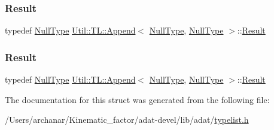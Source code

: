 \mbox{\label{structUtil_1_1TL_1_1Append_3_01NullType_00_01NullType_01_4_adc4800f4356ff026fe01fbcb9e2ce62f}} 
\subsubsection{\texorpdfstring{Result}{Result}\hspace{0.1cm}{\footnotesize\ttfamily [2/3]}}
{\footnotesize\ttfamily typedef \mbox{\hyperlink{classUtil_1_1NullType}{Null\+Type}} \mbox{\hyperlink{structUtil_1_1TL_1_1Append}{Util\+::\+T\+L\+::\+Append}}$<$ \mbox{\hyperlink{classUtil_1_1NullType}{Null\+Type}}, \mbox{\hyperlink{classUtil_1_1NullType}{Null\+Type}} $>$\+::\mbox{\hyperlink{structUtil_1_1TL_1_1Append_3_01NullType_00_01NullType_01_4_adc4800f4356ff026fe01fbcb9e2ce62f}{Result}}}

\mbox{\label{structUtil_1_1TL_1_1Append_3_01NullType_00_01NullType_01_4_adc4800f4356ff026fe01fbcb9e2ce62f}} 
\subsubsection{\texorpdfstring{Result}{Result}\hspace{0.1cm}{\footnotesize\ttfamily [3/3]}}
{\footnotesize\ttfamily typedef \mbox{\hyperlink{classUtil_1_1NullType}{Null\+Type}} \mbox{\hyperlink{structUtil_1_1TL_1_1Append}{Util\+::\+T\+L\+::\+Append}}$<$ \mbox{\hyperlink{classUtil_1_1NullType}{Null\+Type}}, \mbox{\hyperlink{classUtil_1_1NullType}{Null\+Type}} $>$\+::\mbox{\hyperlink{structUtil_1_1TL_1_1Append_3_01NullType_00_01NullType_01_4_adc4800f4356ff026fe01fbcb9e2ce62f}{Result}}}



The documentation for this struct was generated from the following file\+:\begin{DoxyCompactItemize}
\item 
/\+Users/archanar/\+Kinematic\+\_\+factor/adat-\/devel/lib/adat/\mbox{\hyperlink{adat-devel_2lib_2adat_2typelist_8h}{typelist.\+h}}\end{DoxyCompactItemize}
